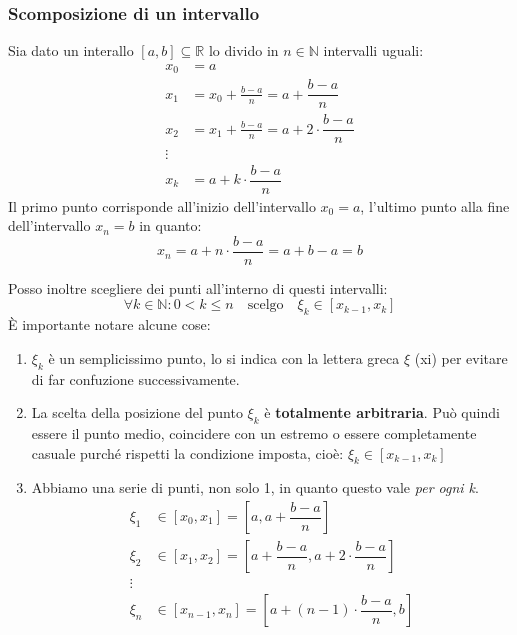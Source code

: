 \subsubsection{Scomposizione di un intervallo}
Sia dato un interallo $[a,b] \subseteq \mathbb{R}$ lo divido in $n \in \mathbb{N}$ intervalli uguali:
\begin{align*}
	x_0 &= a\\
	x_1 &= x_0 + \frac{b-a}{n} = a + \dfrac{b-a}{n}\\
	x_2 &= x_1 + \frac{b-a}{n} = a + 2 \cdot \dfrac{b-a}{n}\\
	\vdots\\
	x_k &= a + k \cdot \dfrac{b-a}{n}
\end{align*}
Il primo punto corrisponde all'inizio dell'intervallo $x_0 = a$, l'ultimo punto alla fine dell'intervallo $x_n = b$ in quanto:
\begin{equation*}
	x_n = a + n \cdot \dfrac{b-a}{n} = a + b - a = b
\end{equation*}

Posso inoltre scegliere dei punti all'interno di questi intervalli: 
\begin{equation*}
	\forall k \in \mathbb{N} : 0 < k \leq n \quad \text{scelgo} \quad \xi_k \in [x_{k-1}, x_k]
\end{equation*}
È importante notare alcune cose:
\begin{enumerate}
	\item $\xi_k$ è un semplicissimo punto, lo si indica con la lettera greca $\xi$ (xi) per evitare di far confuzione successivamente.

	\item La scelta della posizione del punto $\xi_k$ è \textbf{totalmente arbitraria}. Può quindi essere il punto medio, coincidere con un estremo o essere completamente casuale purché rispetti la condizione imposta, cioè: $\xi_k \in [x_{k-1}, x_k]$

	\item Abbiamo una serie di punti, non solo 1, in quanto questo vale \textit{per ogni k}.
	\begin{align*}
		\xi_1 &\in [x_0, x_1] = \left[a, a + \dfrac{b-a}{n} \right]\\
		\xi_2 &\in [x_1, x_2] = \left[a + \dfrac{b-a}{n}, a + 2 \cdot \dfrac{b-a}{n} \right]\\
		\vdots\\
		\xi_n &\in [x_{n-1}, x_n] = \left[a + (n-1) \cdot \dfrac{b-a}{n}, b \right]
	\end{align*}

\end{enumerate}

